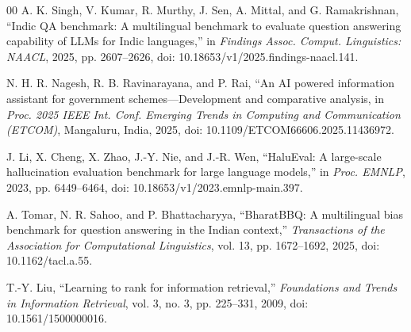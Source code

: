 \documentclass[conference]{IEEEtran}
\begin{document}
\begin{thebibliography}{00}
A. K. Singh, V. Kumar, R. Murthy, J. Sen, A. Mittal, and G. Ramakrishnan, ``Indic QA benchmark: A multilingual benchmark to evaluate question answering capability of LLMs for Indic languages,'' in \textit{Findings Assoc. Comput. Linguistics: NAACL}, 2025, pp. 2607--2626, doi: 10.18653/v1/2025.findings-naacl.141.

N. H. R. Nagesh, R. B. Ravinarayana, and P. Rai, ``An AI powered information assistant for government schemes---Development and comparative analysis, in \textit{Proc. 2025 IEEE Int. Conf. Emerging Trends in Computing and Communication (ETCOM)}, Mangaluru, India, 2025, doi: 10.1109/ETCOM66606.2025.11436972.

J. Li, X. Cheng, X. Zhao, J.-Y. Nie, and J.-R. Wen, ``HaluEval: A large-scale hallucination evaluation benchmark for large language models,'' in \textit{Proc. EMNLP}, 2023, pp. 6449--6464, doi: 10.18653/v1/2023.emnlp-main.397.

A. Tomar, N. R. Sahoo, and P. Bhattacharyya, ``BharatBBQ: A multilingual bias benchmark for question answering in the Indian context,'' \textit{Transactions of the Association for Computational Linguistics}, vol. 13, pp. 1672--1692, 2025, doi: 10.1162/tacl.a.55.

T.-Y. Liu, ``Learning to rank for information retrieval,'' \textit{Foundations and Trends in Information Retrieval}, vol. 3, no. 3, pp. 225--331, 2009, doi: 10.1561/1500000016.

\end{thebibliography}
\end{document}
